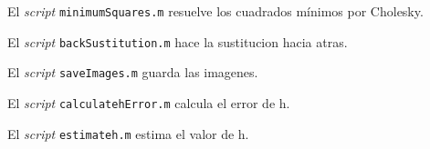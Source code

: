 \documentclass{article}
\begin{document}
\par El \textit{script} \verb+minimumSquares.m+ resuelve los cuadrados mínimos por Cholesky.

\begin{ttfamily}
\begin{center}
\end{center}
\end{ttfamily}

\par El \textit{script} \verb+backSustitution.m+ hace la sustitucion hacia atras.

\begin{ttfamily}
\begin{center}
\end{center}
\end{ttfamily}


\par El \textit{script} \verb+saveImages.m+ guarda las imagenes.

\begin{ttfamily}
\begin{center}
\end{center}
\end{ttfamily}

\par El \textit{script} \verb+calculatehError.m+ calcula el error de h.

\begin{ttfamily}
\begin{center}
\end{center}
\end{ttfamily}


\par El \textit{script} \verb+estimateh.m+ estima el valor de h.

\begin{ttfamily}
\begin{center}
\end{center}
\end{ttfamily}
\end{document}
